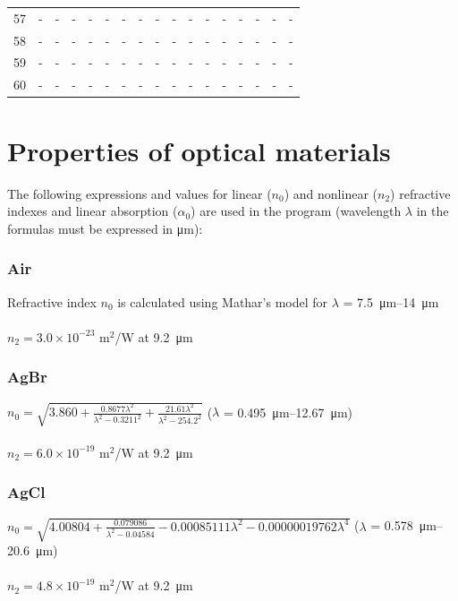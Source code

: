 \documentclass{report}
\begin{document}
\begin{appendices}
\begin{table}
\begin{tabular}{|c|cccc|cccc|cccc|cccc|}
57 &   -   &   -   &   -   &   -   &   -   &   -   &   -   &   -   &   -   &   -   &   -   &   -   &   -   &   -   &   -   &   -   \\
58 &   -   &   -   &   -   &   -   &   -   &   -   &   -   &   -   &   -   &   -   &   -   &   -   &   -   &   -   &   -   &   -   \\
59 &   -   &   -   &   -   &   -   &   -   &   -   &   -   &   -   &   -   &   -   &   -   &   -   &   -   &   -   &   -   &   -   \\
60 &   -   &   -   &   -   &   -   &   -   &   -   &   -   &   -   &   -   &   -   &   -   &   -   &   -   &   -   &   -   &   -   \\
\hline
\end{tabular}
\end{table}


\chapter{Properties of optical materials}
\label{appendix:optical_constants}
The following expressions and values for linear ($n_0$) and nonlinear ($n_2$) refractive indexes and linear absorption ($\alpha_0$) are used in the program (wavelength $\lambda$ in the formulas must be expressed in \si{\micro\meter}):

\subsection*{Air}
Refractive index $n_0$ is calculated using Mathar's model for \(\lambda\) = \SIrange{7.5}{14}{\micro\meter} \cite{Mathar-2007}\\
\\
$n_2 = 3.0\times 10^{-23}$ m$^2$/W at \SI{9.2}{\micro\meter} \cite{Polyanskiy-2021a}

\subsection*{AgBr}
$n_0=\sqrt{3.860 + \frac{0.8677\lambda^2}{\lambda^2-0.3211^2} + \frac{21.61\lambda^2}{\lambda^2-254.2^2}}$ (\(\lambda\) = \SIrange{0.495}{12.67}{\micro\meter}) \cite{Polyanskiy-2023}\\
\\
$n_2 = 6.0\times 10^{-19}$ m$^2$/W at \SI{9.2}{\micro\meter} \cite{Polyanskiy-2023}

\subsection*{AgCl}
$n_0=\sqrt{4.00804+\frac{0.079086}{\lambda^2-0.04584}-0.00085111\lambda^2-0.00000019762\lambda^4}$ (\(\lambda\) = \SIrange{0.578}{20.6}{\micro\meter}) \cite{Tilton-1950}\\
\\
$n_2 = 4.8\times 10^{-19}$ m$^2$/W at \SI{9.2}{\micro\meter} \cite{Polyanskiy-2023}


\end{appendices}
\end{document}
